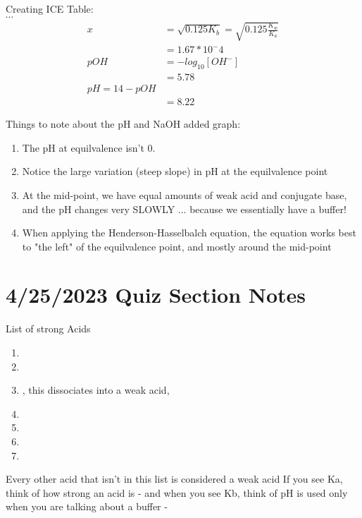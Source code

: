 \documentclass{article}  %
\begin{document}
Creating ICE Table: \\

$\cdots$ %
\begin{equation*}
    \begin{aligned}
        x &= \sqrt{0.125 K_b} = \sqrt{0.125 \frac{K_w}{K_a}} \\
        &= 1.67*10^-4 \\
        pOH &= -log_{10}[OH^-] \\
        &= 5.78 \\
        pH = 14 - pOH \\
        &= 8.22 
    \end{aligned}
\end{equation*}

Things to note about the pH and NaOH added graph:
\begin{enumerate}
    \item The pH at equilvalence isn't 0.
    \item Notice the large variation (steep slope) in pH at the equilvalence point
    \item At the mid-point, we have equal amounts of weak acid and conjugate base, and the pH changes very SLOWLY ... because we essentially have a buffer!
    \item When applying the Henderson-Hasselbalch equation, the equation works best to "the left" of the equilvalence point, and mostly around the mid-point
\end{enumerate}

\section*{4/25/2023 Quiz Section Notes}

List of strong Acids
\begin{enumerate}
    \item {}
    \item {}
    \item {}, this dissociates into a weak acid, 
    \item {}
    \item {}
    \item {}
    \item {}
\end{enumerate}
Every other acid that isn't in this list is considered a weak acid
\newline
If you see Ka, think of how strong an acid is - and when you see Kb, think of 
\newline
pH is used only when you are talking about a buffer - 
\end{document}
